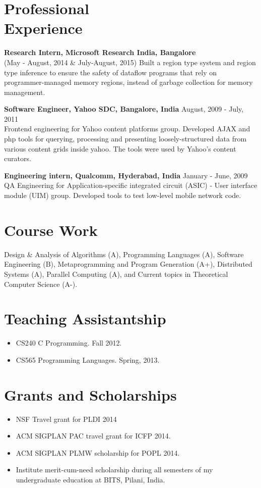 \documentclass[margin,line]{res}
\begin{document}
\begin{resume}
\section{Professional \\ Experience}

{\bf Research Intern, Microsoft Research India, Bangalore} \\
(May - August, 2014 \& July-August, 2015) 
Built a region type system and region type inference to ensure the
safety of dataflow programs that rely on programmer-managed memory
regions, instead of garbage collection for memory management.

{\bf Software Engineer, Yahoo SDC, Bangalore, India} \hfill August, 2009 -
July, 2011\\
Frontend engineering for Yahoo content platforms group. Developed AJAX
and php tools for querying, processing and presenting
loosely-structured data from various content grids inside yahoo. The
tools were used by Yahoo's content curators.

{\bf Engineering intern, Qualcomm, Hyderabad, India} \hfill January - June, 2009\\
QA Engineering for Application-specific integrated circuit (ASIC) -
User interface module (UIM) group. Developed tools to test low-level
mobile network code.

\section{Course Work}
Design \& Analysis of Algorithms (A), Programming Languages (A),
Software Engineering (B), Metaprogramming and Program Generation (A+),
Distributed Systems (A), Parallel Computing (A), and Current topics in
Theoretical Computer Science (A-).  

\section{Teaching Assistantship}
\begin{itemize}
\item CS240 C Programming. Fall 2012.
\item CS565 Programming Languages. Spring, 2013.
\end{itemize}

\section{Grants and Scholarships}
\begin{itemize}
\item NSF Travel grant for PLDI 2014
\item ACM SIGPLAN PAC travel grant for ICFP 2014.
\item ACM SIGPLAN PLMW scholarship for POPL 2014.
\item Institute merit-cum-need scholarship during all 
semesters of my undergraduate education at BITS, Pilani, India.
\end{itemize}


\end{resume}
\end{document}
